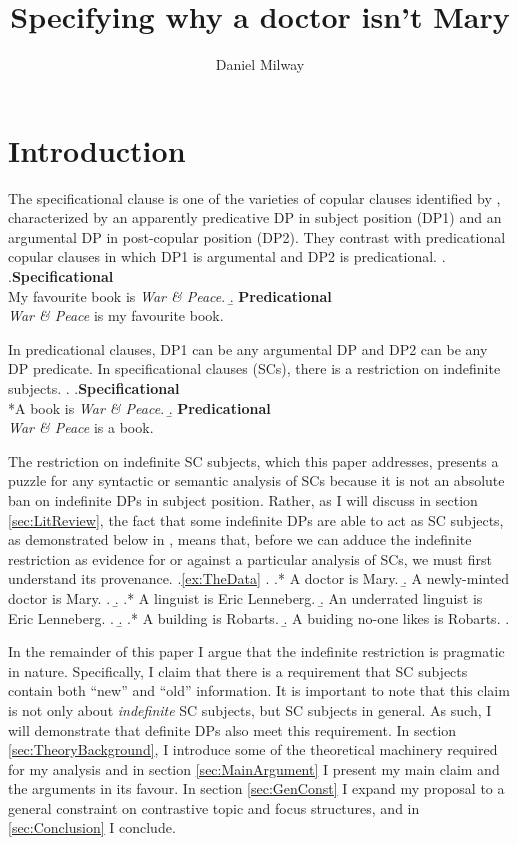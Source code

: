 \documentclass[letterpaper]{article}
\title{Specifying why a doctor isn't Mary}
\author{Daniel Milway}
\begin{document}
\maketitle
\doublespacing
\section{Introduction}
The specificational clause is one of the varieties of copular clauses identified by \textcite{higgins1973pseudo}, characterized by an apparently predicative DP in subject position (DP1) and an argumental DP in post-copular position (DP2).
They contrast with predicational copular clauses in which DP1 is argumental and DP2 is predicational.
\ex.
\a.\textbf{Specificational}\\
My favourite book is \textit{War \& Peace}.
\b. \textbf{Predicational}\\
\textit{War \& Peace} is my favourite book.

In predicational clauses, DP1 can be any argumental DP and DP2 can be any DP predicate.
In specificational clauses (SCs), there is a restriction on indefinite subjects.
\ex.\label{ex:TheData}
\a.\textbf{Specificational}\\
*A book is \textit{War \& Peace}.
\b. \textbf{Predicational}\\
\textit{War \& Peace} is a book.

The restriction on indefinite SC subjects, which this paper addresses, presents a puzzle for any syntactic or semantic analysis of SCs because it is not an absolute ban on indefinite DPs in subject position.
Rather, as I will discuss in section \ref{sec:LitReview}, the fact that some indefinite DPs are able to act as SC subjects, as demonstrated below in \Next, means that, before we can adduce the indefinite restriction as evidence for or against a particular analysis of SCs, we must first understand its provenance.
\ex.\ref{ex:TheData} 
\a.
\a.* A doctor is Mary.
\b. A newly-minted doctor is Mary.
\z.
\b.
\a.* A linguist is Eric Lenneberg.
\b. An underrated linguist is Eric Lenneberg.
\z.
\b.
\a.* A building is Robarts.
\b. A buiding no-one likes is Robarts.
\z.

In the remainder of this paper I argue that the indefinite restriction is pragmatic in nature.
Specifically, I claim that there is a requirement that SC subjects contain both ``new'' and ``old'' information.
It is important to note that this claim is not only about \textit{indefinite} SC subjects, but SC subjects in general.
As such, I will demonstrate that definite DPs also meet this requirement.
In section \ref{sec:TheoryBackground}, I introduce some of the theoretical machinery required for my analysis and in section \ref{sec:MainArgument} I present my main claim and the arguments in its favour.
In section \ref{sec:GenConst} I expand my proposal to a general constraint on contrastive topic and focus structures, and in \ref{sec:Conclusion} I conclude.
\end{document}
